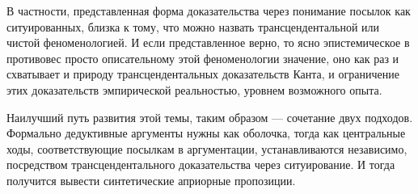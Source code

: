 \documentclass{article}
\begin{document}
В частности, представленная форма доказательства через понимание посылок как ситуированных, близка к тому, что можно назвать трансцендентальной или чистой феноменологией. И если представленное верно, то ясно эпистемическое в противовес просто описательному этой феноменологии значение, оно как раз и схватывает и природу трансцендентальных доказательств Канта, и ограничение этих доказательств эмпирической реальностью, уровнем возможного опыта.

Наилучший путь развития этой темы, таким образом — сочетание двух подходов. Формально дедуктивные аргументы нужны как оболочка, тогда как центральные ходы, соответствующие посылкам в аргументации, устанавливаются независимо, посредством трансцендентального доказательства через ситуирование. И тогда получится вывести синтетические априорные пропозиции.
\end{document}
